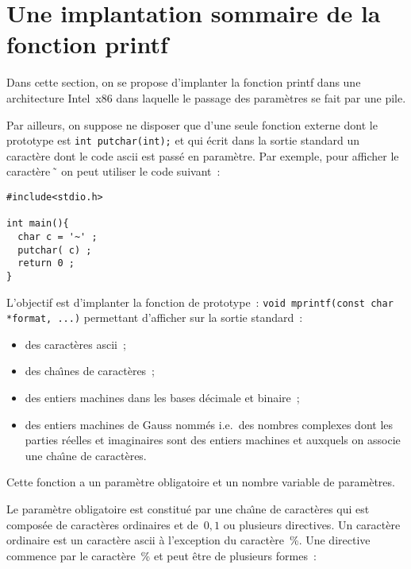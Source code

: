 \section{Une implantation sommaire de la fonction printf}
\label{sec:printf}
Dans cette section, on se propose d'implanter la fonction printf dans
une architecture Intel~x86 dans laquelle le passage des param\`etres
se fait par une pile.

Par ailleurs, on suppose ne disposer que d'une seule fonction externe
dont le prototype est \verb?int putchar(int);? et qui \'ecrit dans la
sortie standard un caract\`ere dont le code ascii est pass\'e en
param\`etre. Par exemple, pour afficher le caract\`ere~\~\, on peut
utiliser le code suivant~:
\begin{verbatim}
#include<stdio.h>

int main(){
  char c = '~' ;
  putchar( c) ;
  return 0 ;
}
\end{verbatim}
L'objectif est d'implanter la fonction de prototype~:
\verb?void mprintf(const char *format, ...)?
permettant d'afficher sur la sortie standard~:
\begin{itemize}
\item des caract\`eres ascii~;
\item des cha\^\i{}nes de caract\`eres~;
\item des entiers machines dans les bases d\'ecimale et binaire~;
\item des entiers machines de Gauss nomm\'es i.e.\ des nombres
  complexes dont les parties r\'eelles et imaginaires sont des entiers
  machines et auxquels on associe une cha\^\i{}ne de caract\`eres.
\end{itemize}
\par
Cette fonction a un param\`etre obligatoire et un nombre variable de
param\`etres. 
\par
Le param\`etre obligatoire est constitu\'e par une cha\^\i{}ne de
caract\`eres qui est compos\'ee de caract\`eres ordinaires et
de~${0, 1}$ ou plusieurs directives.  Un caract\`ere ordinaire est un
caract\`ere ascii \`a l'exception du caract\`ere~\%.  Une directive
commence par le caract\`ere~\% et peut \^etre de plusieurs formes~:
